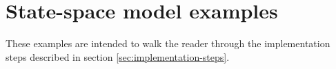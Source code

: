 \section{State-space model examples}

These examples are intended to walk the reader through the implementation steps
described in section \ref{sec:implementation-steps}.







